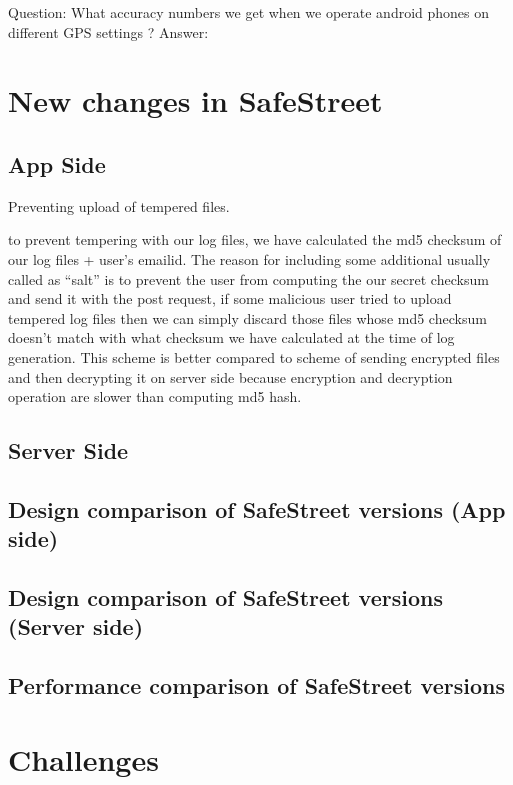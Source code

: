 \documentclass[12pt]{report}
\begin{document}
 Question: What accuracy numbers we get when we operate android phones on
 different GPS settings ? Answer:


\chapter{New changes in SafeStreet}

\section{App Side}
\label{sec:app_side}

Preventing upload of tempered files.

to prevent tempering with our log files, we have calculated the md5 checksum of
our log files + user's emailid. The reason for including some additional usually
called as ``salt'' is to prevent the user from computing the our secret checksum
and send it with the post request, if some malicious user tried to upload
tempered log files then we can simply discard those files whose md5 checksum
doesn't match with what checksum we have calculated at the time of log
generation. This scheme is better compared to scheme of sending encrypted files
and then decrypting it on server side because encryption and decryption
operation are slower than computing md5 hash.

\section{Server Side}
\label{sec:server_side}

\section{Design comparison of SafeStreet versions (App side)}

\section{Design comparison of SafeStreet versions (Server side)}

\section{Performance comparison of SafeStreet versions}

\chapter{Challenges}
\end{document}
